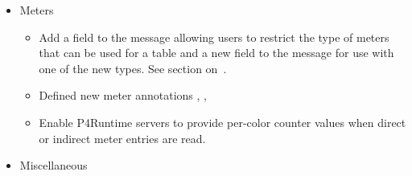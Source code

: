 \documentclass[11pt]{article}
\begin{document}
{\begin{itemize}
\begin{itemize}[noitemsep,topsep=\mdcompacttopsep]
\item{}Enable C++ Arena Allocation~[] by default in
p4runtime.proto.%

\item{}Added Rust code generation%
\end{itemize}%

\item{}
Meters%

\begin{itemize}[noitemsep,topsep=\mdcompacttopsep]%

\item{}Add a  field to the  message allowing users to restrict
the type of meters that can be used for a table and a new  field to
the  message for use with one of the new  types.
See section on~.%

\item{}Defined new meter annotations ,
, %

\item{}Enable P4Runtime servers to provide per-color counter values when direct or
indirect meter entries are read.%
\end{itemize}%

\item{}
Miscellaneous%


\end{itemize}}
\end{document}
